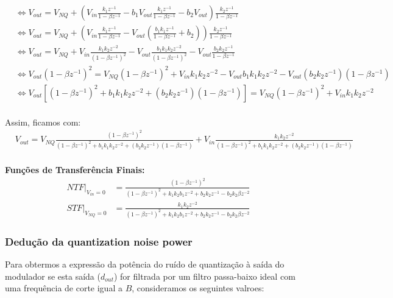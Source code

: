\begin{align*}
    &\iff V_{out} = V_{NQ} + \left( V_{in} \frac{k_1 z^{-1}}{1 - \beta z^{-1}} - b_1 V_{out} \frac{k_1 z^{-1}}{1 - \beta z^{-1}} - b_2 V_{out} \right) \frac{k_2 z^{-1}}{1 - \beta z^{-1}} \\[1.5ex]
    &\iff V_{out} = V_{NQ} + \left( V_{in} \frac{k_1 z^{-1}}{1 - \beta z^{-1}} - V_{out} \left( \frac{b_1 k_1 z^{-1}}{1 - \beta z^{-1}} + b_2 \right) \right) \frac{k_2 z^{-1}}{1 - \beta z^{-1}} \\[1.5ex]
    &\iff V_{out} = V_{NQ} + V_{in} \frac{k_1 k_2 z^{-2}}{(1 - \beta z^{-1})^2} - V_{out} \frac{b_1 k_1 k_2 z^{-2}}{(1 - \beta z^{-1})^2} - V_{out} \frac{b_2 k_2 z^{-1}}{1 - \beta z^{-1}} \\[1.5ex]
    &\iff V_{out} (1 - \beta z^{-1})^2 = V_{NQ} (1 - \beta z^{-1})^2 + V_{in} k_1 k_2 z^{-2} - V_{out} b_1 k_1 k_2 z^{-2} - V_{out} (b_2 k_2 z^{-1})(1 - \beta z^{-1}) \\[1.5ex]
    &\iff V_{out} \left[ (1 - \beta z^{-1})^2 + b_1 k_1 k_2 z^{-2} + (b_2 k_2 z^{-1})(1 - \beta z^{-1}) \right] = V_{NQ} (1 - \beta z^{-1})^2 + V_{in} k_1 k_2 z^{-2} \\[1.5ex]
\end{align*}

Assim, ficamos com:
\begin{align*}
    &V_{out} = V_{NQ} \frac{(1 - \beta z^{-1})^2}{(1 - \beta z^{-1})^2 + b_1 k_1 k_2 z^{-2} + (b_2 k_2 z^{-1})(1 - \beta z^{-1})} + V_{in} \frac{k_1 k_2 z^{-2}}{(1 - \beta z^{-1})^2 + b_1 k_1 k_2 z^{-2} + (b_2 k_2 z^{-1})(1 - \beta z^{-1})} \\[1.5ex]
\end{align*}

\textbf{Funções de Transferência Finais:}
\begin{align*}
    NTF\big|_{V_{in}=0} &= \frac{(1 - \beta z^{-1})^2}{(1 - \beta z^{-1})^2 + k_1 k_2 b_1 z^{-2} + b_2 k_2 z^{-1} - b_2 k_2 \beta z^{-2}} \\[2ex]
    STF\big|_{V_{NQ}=0} &= \frac{k_1 k_2 z^{-2}}{(1 - \beta z^{-1})^2 + k_1 k_2 b_1 z^{-2} + b_2 k_2 z^{-1} - b_2 k_2 \beta z^{-2}}
\end{align*}

\vspace{0.5cm}
\subsubsection{Dedução da quantization noise power}
Para obtermos a expressão da potência do ruído de quantização à saída do modulador se esta saída
($d_{out}$) for filtrada por um filtro passa-baixo ideal com uma frequência de corte igual a $B$, consideramos os seguintes valroes:

